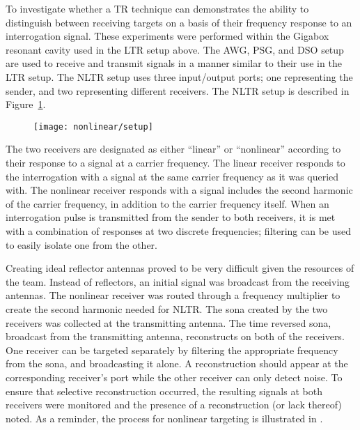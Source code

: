 To investigate whether a TR technique can demonstrates the ability to distinguish between receiving targets on a basis of their frequency response to an interrogation signal. These experiments were performed within the Gigabox resonant cavity used in the LTR setup above. The AWG, PSG, and DSO setup are used to receive and transmit signals in a manner similar to their use in the LTR setup. The NLTR setup uses three input/output ports; one representing the sender, and two representing different receivers. The NLTR setup is described in Figure~\ref{fig:selective-setup}.

\begin{figure}[t]
\centering
\texttt{[image: nonlinear/setup]}
    \caption[]{}
    \label{fig:selective-setup}
\end{figure}

The two receivers are designated as either ``linear'' or ``nonlinear'' according to their response to a signal at a carrier frequency. The linear receiver responds to the interrogation with a signal at the same carrier frequency as it was queried with. The nonlinear receiver responds with a signal includes the second harmonic of the carrier frequency, in addition to the carrier frequency itself. When an interrogation pulse is transmitted from the sender to both receivers, it is met with a combination of responses at two discrete frequencies; filtering can be used to easily isolate one from the other.

Creating ideal reflector antennas proved to be very difficult given the resources of the team.  Instead of reflectors, an initial signal was broadcast from the receiving antennas.  The nonlinear receiver was routed through a frequency multiplier to create the second harmonic needed for NLTR.  The sona created by the two receivers was collected at the transmitting antenna.  The time reversed sona, broadcast from the transmitting antenna, reconstructs on both of the receivers.  One receiver can be targeted separately by filtering the appropriate frequency from the sona, and broadcasting it alone. A reconstruction should appear at the corresponding receiver’s port while the other receiver can only detect noise. To ensure that selective reconstruction occurred, the resulting signals at both receivers were monitored and the presence of a reconstruction (or lack thereof) noted. As a reminder, the process for nonlinear targeting is illustrated in .


